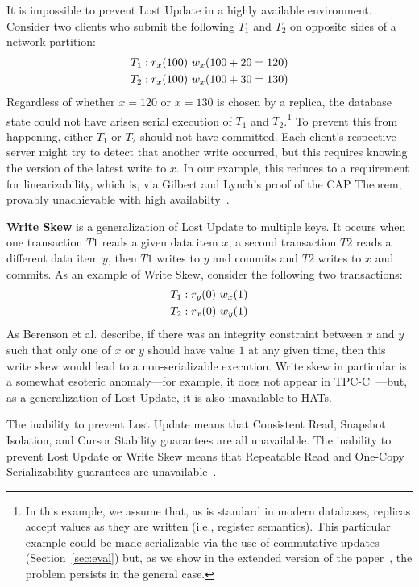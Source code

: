 It is impossible to prevent Lost Update in a highly available
environment. Consider two clients who submit the following $T_1$ and
$T_2$ on opposite sides of a network partition:
\begin{align*}
\small
T_1 &: r_x(100)~w_x(100+20=120)
\\T_2 &: r_x(100)~w_x(100+30=130)
\end{align*}
Regardless of whether $x=120$ or $x=130$ is chosen by a replica, the
database state could not have arisen serial execution of $T_1$ and
$T_2$.\footnote{In this example, we assume that, as is standard in
  modern databases, replicas accept values as they are written (i.e.,
  register semantics). This particular example could be made
  serializable via the use of commutative updates
  (Section~\ref{sec:eval}) but, as we show in the extended version of
  the paper~\cite{hat-tr}, the problem persists in the general case.}
To prevent this from happening, either $T_1$ or $T_2$ should not have
committed. Each client's respective server might try to detect that
another write occurred, but this requires knowing the version of the
latest write to $x$. In our example, this reduces to a requirement for
linearizability, which is, via Gilbert and Lynch's proof of the CAP
Theorem, provably unachievable with high
availabilty~\cite{gilbert-cap}.

\textbf{Write Skew} is a generalization of Lost Update to multiple
keys. It occurs when one transaction $T1$ reads a given data item $x$,
a second transaction $T2$ reads a different data item $y$, then $T1$
writes to $y$ and commits and $T2$ writes to $x$ and commits. As an
example of Write Skew, consider the following two transactions:
\begin{align*}
\small
T_1 &: r_y(0)~w_x(1)
\\T_2 &: r_x(0)~w_y(1)
\end{align*}
As Berenson et al. describe, if there was an integrity constraint
between $x$ and $y$ such that only one of $x$ or $y$ should have value
$1$ at any given time, then this write skew would lead to a
non-serializable execution. Write skew in particular is a somewhat
esoteric anomaly---for example, it does not appear in
TPC-C~\cite{snapshot-serializable}---but, as a generalization of Lost
Update, it is also unavailable to HATs.

The inability to prevent Lost Update means that Consistent Read,
Snapshot Isolation, and Cursor Stability guarantees are all
unavailable. The inability to prevent Lost Update or Write Skew means
that Repeatable Read and One-Copy Serializability guarantees are
unavailable~\cite{adya,ansicritique}.

